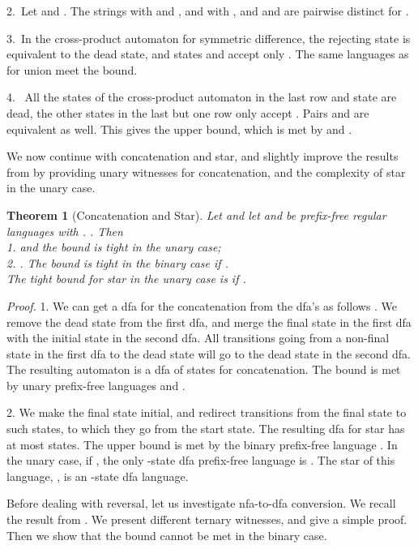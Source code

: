 \documentclass[copyright]{eptcs}
\newtheorem{theorem}{Theorem}
\begin{document}
  2.~Let 
   and
  . 
  The strings   with   and ,
   and   with , 
  and  and 
  are pairwise distinct 
  for  .
 
  3.~In the cross-product automaton for symmetric difference, the rejecting 
  state  is equivalent to the dead state, and 
  states  and  accept only .
  The same languages as for union meet the bound.

  4.~ All the states 
  of the cross-product automaton
  in the last row and state 
  are dead,  the other states in the last but one row only accept .
  Pairs  and  are equivalent as well.
  This gives the upper bound, 
  which is met by
   and
  .
  \hfill\bigskip

 We now continue with concatenation and star,
 and slightly improve the results from \cite{hs09}
 by providing unary witnesses for concatenation,
 and the complexity of star in the unary case.

 \begin{theorem}[Concatenation and Star]\label{thm:con,star}
  Let 
  and let   and  be  prefix-free regular languages with  . .
  Then \\
  1.  and the bound is tight in the unary case;\\
  2. . The bound is tight in the binary case if .\\
  The tight bound for star in the unary case is  if .
 \end{theorem}

 \noindent\emph{Proof.}
  1. We can get a dfa for the concatenation
  from the dfa's   as follows \cite{hs09}.
  We remove the dead state from the first dfa,
  and merge  the final state in the first dfa  
  with the initial state in the second dfa. 
  All transitions going from a non-final state
  in the first dfa to the dead state will go to the dead state in the second dfa.
  The resulting automaton is a dfa of  states for  concatenation.
  The bound is met 
  by unary prefix-free languages  and .

  2. We make the final state initial,
  and redirect  transitions  from the final state
  to such states, to which they go from the start state.
  The resulting dfa for star has at most  states.
  The upper bound  is met by the binary prefix-free  
  language  \cite{hs09}.
  In the unary case, if , the only -state dfa 
  prefix-free language is .
  The star of this language, , is an -state dfa language.
 \hfill\medskip

 Before dealing with reversal, let us investigate  nfa-to-dfa conversion.
 We recall the result from \cite[Theorem 19, which uses the proof of Theorem 6,
 which in turn uses Moore's proof in \cite{mo71}]{bhk09}.
 We present different ternary witnesses, and give a simple proof. 
 Then we show that the  bound cannot be met in the binary case.
\end{document}
